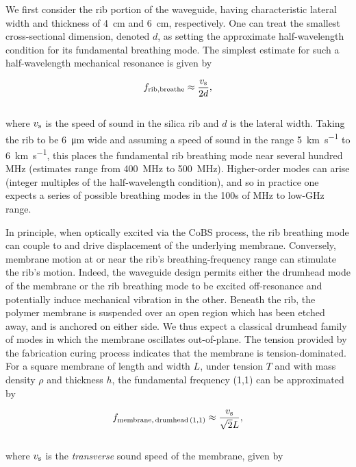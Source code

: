We first consider the rib portion of the waveguide, having characteristic lateral width and thickness of \SI{4}{\centi\meter} and \SI{6}{\centi\meter}, respectively. One can treat the smallest cross-sectional dimension, denoted \(d\), as setting the approximate half-wavelength condition for its fundamental breathing mode. The simplest estimate for such a half-wavelength mechanical resonance is given by

\begin{equation}
f_{\rm rib,breathe} \approx \frac{v_{\rm s}}{2d},
\end{equation}
\\
where \(v_{\rm s}\) is the speed of sound in the silica rib and \(d\) is the lateral width. Taking the rib to be \SI{6}{\micro\meter} wide and assuming a speed of sound in the range \SI{5}{\kilo\meter\per\second} to \SI{6}{\kilo\meter\per\second}, this places the fundamental rib breathing mode near several hundred \si{\mega\hertz} (estimates range from \SI{400}{\mega\hertz} to \SI{500}{\mega\hertz}). Higher-order modes can arise (integer multiples of the half-wavelength condition), and so in practice one expects a series of possible breathing modes in the 100s of \si{\mega\hertz} to low-\si{\giga\hertz} range.

In principle, when optically excited via the \ac{CoBS} process, the rib breathing mode can couple to and drive displacement of the underlying membrane. Conversely, membrane motion at or near the rib’s breathing-frequency range can stimulate the rib's motion. Indeed, the waveguide design permits either the drumhead mode of the membrane or the rib breathing mode to be excited off-resonance and potentially induce mechanical vibration in the other. Beneath the rib, the polymer membrane is suspended over an open region which has been etched away, and is anchored on either side. We thus expect a classical drumhead family of modes in which the membrane oscillates out-of-plane. The tension provided by the fabrication curing process indicates that the membrane is tension-dominated. For a square membrane of length and width \(L\), under tension \(T\) and with mass density \(\rho\) and thickness \(h\), the fundamental frequency (1,1) can be approximated by

\begin{equation}
  f_{\rm membrane,\,drumhead\,(1,1)} \approx \frac{v_{\rm s}}{\sqrt{2}L},
  \label{eq:Raman:SquareMembrane}
\end{equation}
\\
where \(v_{\rm s}\) is the \emph{transverse} sound speed of the membrane, given by

